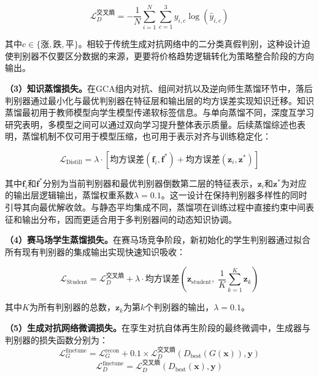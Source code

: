 \begin{equation}
\mathcal{L}_{D}^{\text{交叉熵}} = -\frac{1}{N}\sum_{i=1}^{N}\sum_{c=1}^{3} y_{i,c} \log(\hat{y}_{i,c})
\label{eq:disc_ce_loss}
\end{equation}

其中$c \in \{\text{涨}, \text{跌}, \text{平}\}$。相较于传统生成对抗网络中的二分类真假判别，这种设计迫使判别器不仅要区分数据的来源，更要将价格趋势逻辑转化为策略整合阶段的方向输出。

\textbf{（3）知识蒸馏损失。}在GCA组内对抗、组间对抗以及逆向师生蒸馏环节中，落后判别器通过最小化与最优判别器在特征层和输出层的均方误差实现知识迁移。知识蒸馏最初用于教师模型向学生模型传递软标签信息\cite{hinton2015distilling}。与单向蒸馏不同，深度互学习研究表明，多模型之间可以通过双向学习提升整体表示质量\cite{zhang2018deep}。后续蒸馏综述也表明，蒸馏机制不仅可用于模型压缩，也可用于表示对齐与训练稳定化\cite{huang2022distillation}：

\begin{equation}
\mathcal{L}_{\text{Distill}} = \lambda \cdot \left[\text{均方误差}(\mathbf{f}_i, \mathbf{f}^*) + \text{均方误差}(\mathbf{z}_i, \mathbf{z}^*)\right]
\label{eq:distill_loss}
\end{equation}

其中$\mathbf{f}_i$和$\mathbf{f}^*$分别为当前判别器和最优判别器倒数第二层的特征表示，$\mathbf{z}_i$和$\mathbf{z}^*$为对应的输出层逻辑输出，蒸馏权重系数$\lambda=0.1$。这一设计在保持判别器多样性的同时引导其向最优解收敛。与静态平均集成不同，蒸馏项在训练过程中直接约束中间表征和输出分布，因而更适合用于多判别器间的动态知识协调。

\textbf{（4）赛马场学生蒸馏损失。}在赛马场竞争阶段，新初始化的学生判别器通过拟合所有现有判别器的集成输出实现快速知识吸收：

\begin{equation}
\mathcal{L}_{\text{Student}} = \mathcal{L}_D^{\text{交叉熵}} + \lambda \cdot \text{均方误差}\left(\mathbf{z}_{\text{student}},\; \frac{1}{K}\sum_{k=1}^{K}\mathbf{z}_k\right)
\label{eq:rt_student_loss}
\end{equation}

其中$K$为所有判别器的总数，$\mathbf{z}_k$为第$k$个判别器的输出，$\lambda=0.1$。

\textbf{（5）生成对抗网络微调损失。}在孪生对抗自体再生阶段的最终微调中，生成器与判别器的损失函数分别为：
\begin{equation}
\mathcal{L}_{G}^{\text{finetune}} = \mathcal{L}_{G}^{\text{recon}} + 0.1 \times \mathcal{L}_{D}^{\text{交叉熵}}(D_{\text{best}}(G(\mathbf{x})), \mathbf{y})
\label{eq:gan_finetune_g}
\end{equation}
\begin{equation}
\mathcal{L}_{D}^{\text{finetune}} = \mathcal{L}_{D}^{\text{交叉熵}}(D_{\text{best}}(\mathbf{x}), \mathbf{y})
\label{eq:gan_finetune_d}
\end{equation}

